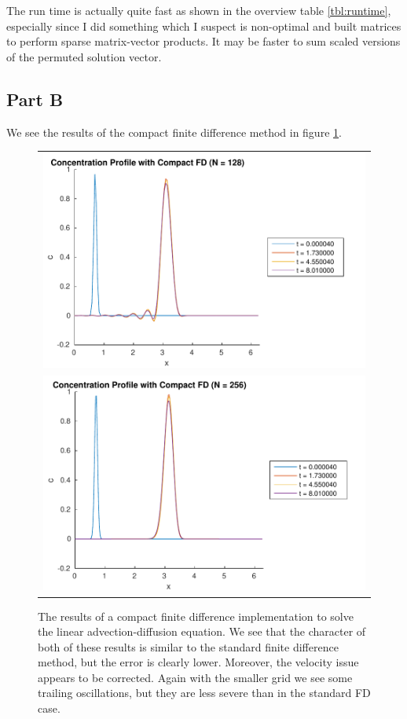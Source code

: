 \documentclass{article}
\begin{document}
The run time is actually quite fast as shown in the overview table \ref{tbl:runtime}, especially since I did something which I suspect is non-optimal and built matrices to perform sparse matrix-vector products.
It may be faster to sum scaled versions of the permuted solution vector.

\clearpage
\subsection{Part B}
We see the results of the compact finite difference method in figure \ref{fig:compact-fd}.

\begin{figure}[!ht]
\centering
\begin{tabular}{c}
\includegraphics[scale=0.8]{p2b_128.pdf} \\
\includegraphics[scale=0.8]{p2b_256.pdf}
\end{tabular}
\caption{The results of a compact finite difference implementation to solve the linear advection-diffusion equation.
We see that the character of both of these results is similar to the standard finite difference method, but the error is clearly lower.
Moreover, the velocity issue appears to be corrected.
Again with the smaller grid we see some trailing oscillations, but they are less severe than in the standard FD case.
}
\label{fig:compact-fd}
\end{figure}
\end{document}
